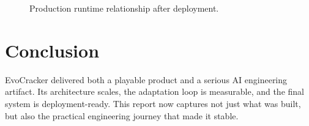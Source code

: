 \documentclass[11pt,a4paper,twoside]{article}
\begin{document}
\begin{figure}[htbp]
\centering
{}
\caption{Production runtime relationship after deployment.}
\label{fig:ops}
\end{figure}

\section{Conclusion}

EvoCracker delivered both a playable product and a serious AI engineering artifact.
Its architecture scales, the adaptation loop is measurable, and the final system is deployment-ready.
This report now captures not just what was built, but also the practical engineering journey that made it stable.
\end{document}
